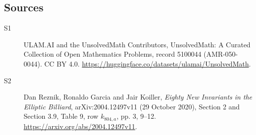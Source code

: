 \documentclass[11pt]{article}
\begin{document}
\subsection{Sources}
\begin{description}
\item[\hypertarget{source:5100044:1}{S1}] ULAM.AI and the UnsolvedMath Contributors, UnsolvedMath: A Curated Collection of Open Mathematics Problems, record 5100044 (AMR-050-0044). CC BY 4.0. \url{https://huggingface.co/datasets/ulamai/UnsolvedMath}.
\item[\hypertarget{source:5100044:2}{S2}] Dan Reznik, Ronaldo Garcia and Jair Koiller, \emph{Eighty New Invariants in the Elliptic Billiard}, arXiv:2004.12497v11 (29 October 2020), Section 2 and Section 3.9, Table 9, row $k_{804,a}$, pp. 3, 9--12. \url{https://arxiv.org/abs/2004.12497v11}.
\end{description}
\label{end:5100044}
\end{document}
